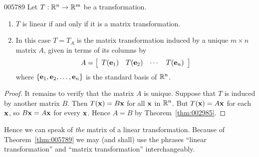 \begin{theorem}{}{005789}
Let $T : \mathbb{R}^n \to \mathbb{R}^m$ be a transformation.

\begin{enumerate}
\item $T$ is linear if and only if it is a matrix transformation.

\item In this case $T = T_{A}$ is the matrix transformation induced by a unique $m \times n$ matrix $A$, given in terms of its columns by
\begin{equation*}
A = \left[ \begin{array}{cccc}
T(\textbf{e}_{1}) & T(\textbf{e}_{2}) & \cdots & T(\textbf{e}_{n})
\end{array} \right]
\end{equation*}
where $\{\textbf{e}_{1}, \textbf{e}_{2}, \dots, \textbf{e}_{n}\}$ is the standard basis of $\mathbb{R}^n$.

\end{enumerate}
\end{theorem}

\begin{proof}
It remains to verify that the matrix $A$ is unique. Suppose that $T$ is induced by another matrix $B$. Then $T(\textbf{x}) = B\textbf{x}$ for all $\textbf{x}$ in $\mathbb{R}^n$. But $T(\textbf{x}) = A\textbf{x}$ for each $\textbf{x}$, so $B\textbf{x} = A\textbf{x}$ for every $\textbf{x}$. Hence $A = B$ by Theorem~\ref{thm:002985}.
\end{proof}

Hence we can speak of \textit{the} matrix of a linear transformation. Because of Theorem~\ref{thm:005789} we may (and shall) use the phrases ``linear transformation'' and ``matrix transformation'' interchangeably.

